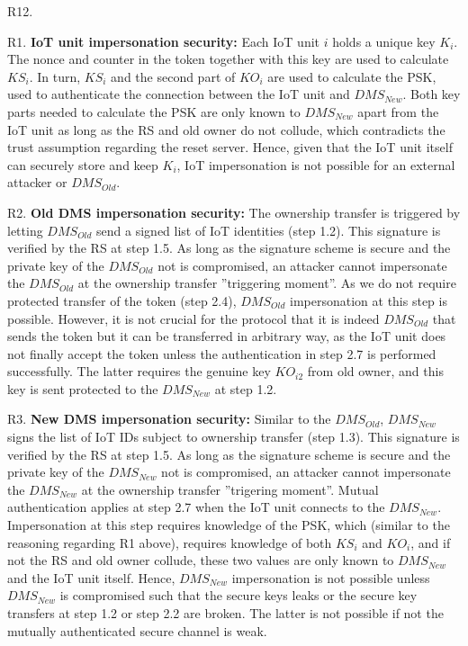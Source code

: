 {\begin{labeling}{R12.}
\item [R1.] \textbf{IoT unit impersonation security:} Each IoT unit $i$ holds a unique key $K_i$. The nonce and counter in the token together with this key are used to calculate $KS_i$. In turn, $KS_i$ and the second part of $KO_i$ are used to calculate the PSK, used to authenticate the connection between the IoT unit and $DMS_{New}$. Both key parts needed to calculate the PSK are only known to $DMS_{New}$ apart from the IoT unit as long as the RS and old owner do not collude, which contradicts the trust assumption regarding the reset server. Hence, given that the IoT unit itself can securely store and keep $K_i$, IoT impersonation is not possible for an external attacker or $DMS_{Old}$. 
\item [R2.] \textbf{Old DMS impersonation security:} The ownership transfer is triggered by letting $DMS_{Old}$ send a signed list of IoT identities (step 1.2). This signature is verified by the RS at step 1.5. As long as the signature scheme is secure and the private key of the $DMS_{Old}$ not is compromised, an attacker cannot impersonate the $DMS_{Old}$ at the ownership transfer ''triggering moment''. As we do not require protected transfer of the token (step 2.4), $DMS_{Old}$ impersonation at this step is possible. However, it is not crucial for the protocol that it is indeed $DMS_{Old}$ that sends the token but it can be transferred in arbitrary way, as the IoT unit does not finally accept the token unless the authentication in step 2.7 is performed successfully. The latter requires the genuine key $KO_{i2}$ from old owner, and this key is sent protected to the $DMS_{New}$ at step 1.2. 
\item [R3.] \textbf{New DMS impersonation security:} %
Similar to the  $DMS_{Old}$, $DMS_{New}$ signs the list of IoT IDs subject to ownership transfer (step 1.3). This signature is verified by the RS  at step 1.5. As long as the signature scheme is secure and the private key of the $DMS_{New}$ not is compromised, an attacker cannot impersonate the $DMS_{New}$ at the ownership transfer ''trigering moment''. Mutual authentication applies at step 2.7 when the IoT unit connects to the $DMS_{New}$. Impersonation at this step requires knowledge of the PSK, which (similar to the reasoning regarding R1 above), requires knowledge of both $KS_i$ and $KO_i$, and if not the RS and old owner collude, these two values are only known to $DMS_{New}$ and the IoT unit itself. Hence, $DMS_{New}$ impersonation is not possible unless $DMS_{New}$ is compromised such that the secure keys leaks or the secure key transfers at step 1.2 or step 2.2 are broken. The latter is not possible if not the mutually authenticated secure channel is weak.

\end{labeling}}
